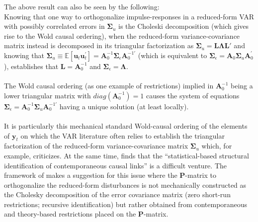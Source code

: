 \documentclass[a4paper,11pt,listof=nochaptergap,oneside,pointednumbers,bibtotoc,bigheadings,liststotoc,hidelinks]{scrbook}
\theoremstyle{mysatz}
\theoremstyle{mydefinition}
\theoremstyle{mytheorem}
\theoremstyle{mybemerkung}
\newcommand{\vect}[1]{\boldsymbol{\mathbf{#1}}}
\begin{document}
The above result can also be seen by the following:\\
Knowing that one way to orthogonalize impulse-responses in a reduced-form VAR with possibly correlated errors in $\vect{\Sigma}_u$ is the Choleski decomposition (which gives rise to the Wold causal ordering), when the reduced-form variance-covariance matrix instead is decomposed in its triangular factorization as $\vect{\Sigma}_u = \vect{L}\vect{\Lambda}\vect{L}'$ and knowing that $\vect{\Sigma}_u  \equiv \mathbb{E}[\vect{u}_t\vect{u}_t^']= \vect{A}_0^{-1}\vect{\Sigma}_\epsilon\vect{A}_0^{-1'}$ (which is equivalent to $\vect{\Sigma}_\epsilon = \vect{A}_0\vect{\Sigma}_u\vect{A}_0^'$), establishes that $\vect{L} = \vect{A}_0^{-1}$ and $\vect{\Sigma}_\epsilon = \vect{\Lambda}$. 
\\
\\
The Wold causal ordering (as one example of restrictions) implied in $\vect{A}_0^{-1}$ being a lower triangular matrix with $diag(\vect{A}_0^{-1}) = 1$ causes the system of equations $\vect{\Sigma}_\epsilon  = \vect{A}_0^{-1}\vect{\Sigma}_u\vect{A}_0^{-1'}$ having a unique solution (at least locally).
\\
\\
It is particularly this mechanical standard Wold-causal ordering of the elements of $\vect{y}_t$ on which the VAR literature often relies to establish the triangular factorization of the reduced-form variance-covariance matrix $\vect{\Sigma}_u$ which, for example, \citet{jorda:05} criticizes. At the same time, \citet[p. 4]{jorda:05} finds that the ``statistical-based structural identification of contemporaneous causal links'' is a difficult venture. The framework of \citet{ludvigsonetal:18,ludvigsonetal:19} makes a suggestion for this issue where the $\vect{P}$-matrix to orthogonalize the reduced-form disturbances is not mechanically constructed as the Cholesky decomposition of the error covariance matrix (zero short-run restrictions; recursive identification) but rather obtained from contemporaneous and theory-based restrictions placed on the $\vect{P}$-matrix.
\end{document}
